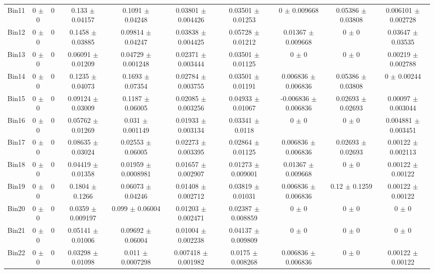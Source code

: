 \begin{tabular}{@{\extracolsep{4pt}}lccccccccc@{}}
     Bin11 & 0 $\pm$ 0 & 0 & 0.133 $\pm$ 0.04157 & 0.1091 $\pm$ 0.04248 & 0.03801 $\pm$ 0.004426 & 0.03501 $\pm$ 0.01253 & 0 $\pm$ 0.009668 & 0.05386 $\pm$ 0.03808 & 0.006101 $\pm$ 0.002728 \\ 
     Bin12 & 0 $\pm$ 0 & 0 & 0.1458 $\pm$ 0.03885 & 0.09814 $\pm$ 0.04247 & 0.03838 $\pm$ 0.004425 & 0.05728 $\pm$ 0.01212 & 0.01367 $\pm$ 0.009668 & 0 $\pm$ 0 & 0.03647 $\pm$ 0.03535 \\ 
     Bin13 & 0 $\pm$ 0 & 0 & 0.06091 $\pm$ 0.01209 & 0.04729 $\pm$ 0.001248 & 0.02371 $\pm$ 0.003444 & 0.03501 $\pm$ 0.01125 & 0 $\pm$ 0 & 0 $\pm$ 0 & 0.00219 $\pm$ 0.002788 \\ 
     Bin14 & 0 $\pm$ 0 & 0 & 0.1235 $\pm$ 0.04073 & 0.1693 $\pm$ 0.07354 & 0.02784 $\pm$ 0.003755 & 0.03501 $\pm$ 0.01191 & 0.006836 $\pm$ 0.006836 & 0.05386 $\pm$ 0.03808 & 0 $\pm$ 0.00244 \\ 
     Bin15 & 0 $\pm$ 0 & 0 & 0.09124 $\pm$ 0.03009 & 0.1187 $\pm$ 0.06005 & 0.02085 $\pm$ 0.003256 & 0.04933 $\pm$ 0.01067 & -0.006836 $\pm$ 0.006836 & 0.02693 $\pm$ 0.02693 & 0.00097 $\pm$ 0.003044 \\ 
     Bin16 & 0 $\pm$ 0 & 0 & 0.05762 $\pm$ 0.01269 & 0.031 $\pm$ 0.001149 & 0.01933 $\pm$ 0.003134 & 0.03341 $\pm$ 0.0118 & 0 $\pm$ 0 & 0 $\pm$ 0 & 0.004881 $\pm$ 0.003451 \\ 
     Bin17 & 0 $\pm$ 0 & 0 & 0.08635 $\pm$ 0.03024 & 0.02553 $\pm$ 0.06005 & 0.02273 $\pm$ 0.003395 & 0.02864 $\pm$ 0.01125 & 0.006836 $\pm$ 0.006836 & 0.02693 $\pm$ 0.02693 & 0.00122 $\pm$ 0.002113 \\ 
     Bin18 & 0 $\pm$ 0 & 0 & 0.04419 $\pm$ 0.01358 & 0.01959 $\pm$ 0.0008981 & 0.01657 $\pm$ 0.002907 & 0.01273 $\pm$ 0.009001 & 0.01367 $\pm$ 0.009668 & 0 $\pm$ 0 & 0.00122 $\pm$ 0.00122 \\ 
     Bin19 & 0 $\pm$ 0 & 0 & 0.1804 $\pm$ 0.1266 & 0.06073 $\pm$ 0.04246 & 0.01408 $\pm$ 0.002712 & 0.03819 $\pm$ 0.01031 & 0.006836 $\pm$ 0.006836 & 0.12 $\pm$ 0.1259 & 0.00122 $\pm$ 0.00122 \\ 
     Bin20 & 0 $\pm$ 0 & 0 & 0.0359 $\pm$ 0.009197 & 0.099 $\pm$ 0.06004 & 0.01203 $\pm$ 0.002471 & 0.02387 $\pm$ 0.008859 & 0 $\pm$ 0 & 0 $\pm$ 0 & 0 $\pm$ 0 \\ 
     Bin21 & 0 $\pm$ 0 & 0 & 0.05141 $\pm$ 0.01006 & 0.09692 $\pm$ 0.06004 & 0.01004 $\pm$ 0.002238 & 0.04137 $\pm$ 0.009809 & 0 $\pm$ 0 & 0 $\pm$ 0 & 0 $\pm$ 0 \\ 
     Bin22 & 0 $\pm$ 0 & 0 & 0.03298 $\pm$ 0.01098 & 0.011 $\pm$ 0.0007298 & 0.007418 $\pm$ 0.001982 & 0.0175 $\pm$ 0.008268 & 0.006836 $\pm$ 0.006836 & 0 $\pm$ 0 & 0.00122 $\pm$ 0.00122 \\ 

\end{tabular}
